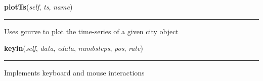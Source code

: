     \vspace{0.5ex}

    \begin{boxedminipage}{\textwidth}

    \raggedright \textbf{plotTs}(\textit{self}, \textit{ts}, \textit{name})

    \vspace{-1.5ex}

    \rule{\textwidth}{0.5\fboxrule}
    Uses gcurve to plot the time-series of a given city object

    \vspace{1ex}

    \end{boxedminipage}

    \label{Epigrass:epiplay:viewer:keyin}

    \vspace{0.5ex}

    \begin{boxedminipage}{\textwidth}

    \raggedright \textbf{keyin}(\textit{self}, \textit{data}, \textit{edata}, \textit{numbsteps}, \textit{pos}, \textit{rate})

    \vspace{-1.5ex}

    \rule{\textwidth}{0.5\fboxrule}
    Implements keyboard and mouse interactions

    \vspace{1ex}

    \end{boxedminipage}

